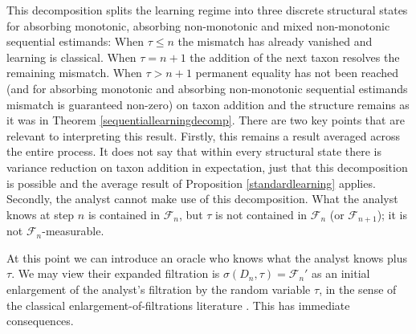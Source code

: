 \documentclass{article}
\begin{document}
This decomposition splits the learning regime into three discrete structural states for absorbing monotonic, absorbing non-monotonic and mixed non-monotonic sequential estimands: When $\tau \leq n$ the mismatch has already vanished and learning is classical. When $\tau = n+1$ the addition of the next taxon resolves the remaining mismatch. When $\tau > n+1$ permanent equality has not been reached (and for absorbing monotonic and absorbing non-monotonic sequential estimands mismatch is guaranteed non-zero) on taxon addition and the structure remains as it was in Theorem \ref{sequentiallearningdecomp}. There are two key points that are relevant to interpreting this result. Firstly, this remains a result averaged across the entire process. It does not say that within every structural state there is variance reduction on taxon addition in expectation, just that this decomposition is possible and the average result of Proposition \ref{standardlearning} applies. Secondly, the analyst cannot make use of this decomposition. What the analyst knows at step $n$ is contained in $\mathcal{F}_n$, but $\tau$ is not contained in $\mathcal{F}_n$ (or $\mathcal{F}_{n+1}$); it is not $\mathcal{F}_n$-measurable.

At this point we can introduce an oracle who knows what the analyst knows plus $\tau$. We may view their expanded filtration is $\sigma(D_n, \tau)=\mathcal{F}_n'$ as an initial enlargement of the analyst’s filtration by the random variable $\tau$, in the sense of the classical enlargement-of-filtrations literature \citep{grigorian2023}. This has immediate consequences.
\end{document}
